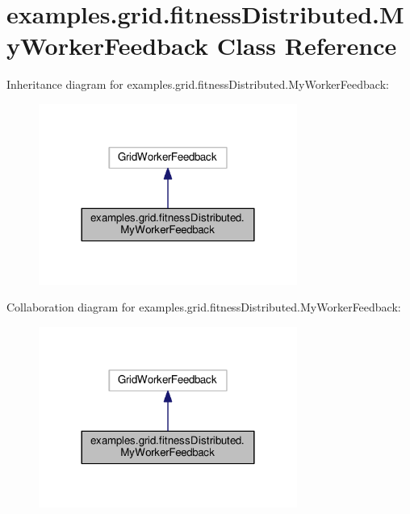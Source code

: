 \hypertarget{classexamples_1_1grid_1_1fitness_distributed_1_1_my_worker_feedback}{\section{examples.\-grid.\-fitness\-Distributed.\-My\-Worker\-Feedback Class Reference}
\label{classexamples_1_1grid_1_1fitness_distributed_1_1_my_worker_feedback}
}


Inheritance diagram for examples.\-grid.\-fitness\-Distributed.\-My\-Worker\-Feedback\-:
\nopagebreak
\begin{figure}[H]
\begin{center}
\leavevmode
\includegraphics[width=240pt]{classexamples_1_1grid_1_1fitness_distributed_1_1_my_worker_feedback__inherit__graph}
\end{center}
\end{figure}


Collaboration diagram for examples.\-grid.\-fitness\-Distributed.\-My\-Worker\-Feedback\-:
\nopagebreak
\begin{figure}[H]
\begin{center}
\leavevmode
\includegraphics[width=240pt]{classexamples_1_1grid_1_1fitness_distributed_1_1_my_worker_feedback__coll__graph}
\end{center}
\end{figure}
